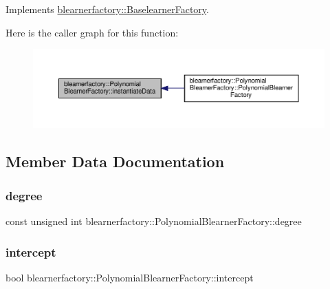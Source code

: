 Implements \mbox{\hyperlink{classblearnerfactory_1_1_baselearner_factory_ac4a38c4815fb33b8d4785745117c5e57}{blearnerfactory\+::\+Baselearner\+Factory}}.

Here is the caller graph for this function\+:\nopagebreak
\begin{figure}[H]
\begin{center}
\leavevmode
\includegraphics[width=350pt]{classblearnerfactory_1_1_polynomial_blearner_factory_aeea9c480671ae7cf7d3be470ce0feaef_icgraph}
\end{center}
\end{figure}


\subsection{Member Data Documentation}
\mbox{\label{classblearnerfactory_1_1_polynomial_blearner_factory_a78c1852e3f1e1b43e6d8bef40032e19f}} 
\subsubsection{\texorpdfstring{degree}{degree}}
{\footnotesize\ttfamily const unsigned int blearnerfactory\+::\+Polynomial\+Blearner\+Factory\+::degree\hspace{0.3cm}{\ttfamily [private]}}

\mbox{\label{classblearnerfactory_1_1_polynomial_blearner_factory_a3a358bd08863c8f01fe20c8d55393df7}} 
\subsubsection{\texorpdfstring{intercept}{intercept}}
{\footnotesize\ttfamily bool blearnerfactory\+::\+Polynomial\+Blearner\+Factory\+::intercept\hspace{0.3cm}{\ttfamily [private]}}



